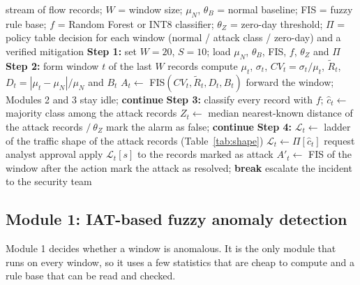 \documentclass[]{interact}
\theoremstyle{plain}
\theoremstyle{definition}
\newcommand{\Step}[1]{\State \textbf{Step #1:}}
\begin{document}
\begin{algorithm}[htbp]
\caption{The IATFCM algorithm}
\label{alg:iatfcm}
\small
\begin{algorithmic}[1]
\Require stream of flow records; $W$ = window size; $\mu_N$, $\theta_B$ = normal baseline; FIS = fuzzy rule base; $f$ = Random Forest or INT8 classifier; $\theta_Z$ = zero-day threshold; $\Pi$ = policy table
\Ensure decision for each window (normal / attack class / zero-day) and a verified mitigation
\Step{1} set $W = 20$, $S = 10$; load $\mu_N$, $\theta_B$, FIS, $f$, $\theta_Z$ and $\Pi$
  \Step{2} 
  \State form window $t$ of the last $W$ records
  \State compute $\mu_t$, $\sigma_t$, $CV_t = \sigma_t/\mu_t$, $\tilde{R}_t$, $D_t = |\mu_t-\mu_N|/\mu_N$ and $B_t$
  \State $A_t \gets$ FIS$(CV_t, \tilde{R}_t, D_t, B_t)$ 
    \State forward the window; Modules 2 and 3 stay idle; \textbf{continue}
  \EndIf
  \Step{3} 
  \State classify every record with $f$; $\hat{c}_t \gets$ majority class among the attack records
  \State $Z_t \gets$ median nearest-known distance of the attack records $/\ \theta_Z$
    \State mark the alarm as false; \textbf{continue}
  \EndIf
  \Step{4} 
    \State $\mathcal{L}_t \gets$ ladder of the traffic shape of the attack records (Table~\ref{tab:shape})
  \Else
    \State $\mathcal{L}_t \gets \Pi[\hat{c}_t]$ 
  \EndIf
      \State request analyst approval
    \EndIf
    \State apply $\mathcal{L}_t[s]$ to the records marked as attack
    \State $A'_t \gets$ FIS of the window after the action
      \State mark the attack as resolved; \textbf{break}
    \EndIf
  \EndFor
    \State escalate the incident to the security team
  \EndIf
\EndWhile
\end{algorithmic}
\end{algorithm}


\subsection{Module 1: IAT-based fuzzy anomaly detection}\label{sec:m1}
Module 1 decides whether a window is anomalous. It is the only module that runs on every window, so it uses a few statistics that are cheap to compute and a rule base that can be read and checked.
\end{document}
